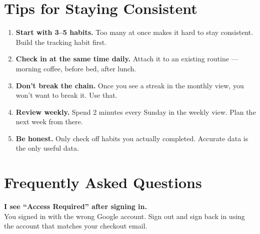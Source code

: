 \documentclass[10pt, a4paper]{article}
\begin{document}
\vspace{6pt}

\section{Tips for Staying Consistent}

\vspace{2pt}

\begin{enumerate}[leftmargin=*, itemsep=3pt, topsep=0pt,
  label=\textbf{\textcolor{accent}{\arabic*.}}]
  \item \textbf{Start with 3--5 habits.}
    {\fontsize{8.5}{11}\selectfont\color{muted}
    Too many at once makes it hard to stay consistent. Build the tracking habit first.}

  \item \textbf{Check in at the same time daily.}
    {\fontsize{8.5}{11}\selectfont\color{muted}
    Attach it to an existing routine --- morning coffee, before bed, after lunch.}

  \item \textbf{Don't break the chain.}
    {\fontsize{8.5}{11}\selectfont\color{muted}
    Once you see a streak in the monthly view, you won't want to break it. Use that.}

  \item \textbf{Review weekly.}
    {\fontsize{8.5}{11}\selectfont\color{muted}
    Spend 2 minutes every Sunday in the weekly view. Plan the next week from there.}

  \item \textbf{Be honest.}
    {\fontsize{8.5}{11}\selectfont\color{muted}
    Only check off habits you actually completed. Accurate data is the only useful data.}
\end{enumerate}

\vspace{6pt}

\section{Frequently Asked Questions}

\vspace{2pt}

\noindent\textbf{I see ``Access Required'' after signing in.}\\
{\fontsize{8.5}{11}\selectfont\color{muted}
You signed in with the wrong Google account. Sign out and sign back in using the account that matches your checkout email.}
\end{document}
